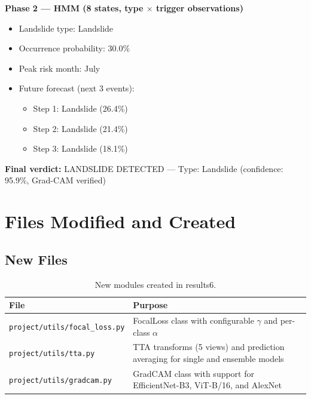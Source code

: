 \documentclass[11pt]{article}
\begin{document}
\vspace{0.3cm}
\noindent \textbf{Phase 2 --- HMM (8 states, type $\times$ trigger observations)}
\begin{itemize}[noitemsep]
    \item Landslide type: Landslide
    \item Occurrence probability: 30.0\%
    \item Peak risk month: July
    \item Future forecast (next 3 events):
    \begin{itemize}
        \item Step 1: Landslide (26.4\%)
        \item Step 2: Landslide (21.4\%)
        \item Step 3: Landslide (18.1\%)
    \end{itemize}
\end{itemize}

\noindent \textbf{Final verdict:} LANDSLIDE DETECTED --- Type: Landslide (confidence: 95.9\%, Grad-CAM verified)

\section{Files Modified and Created}

\subsection{New Files}

\begin{table}[H]
\centering
\renewcommand{\arraystretch}{1.2}
\begin{tabularx}{\textwidth}{lX}
\toprule
\textbf{File} & \textbf{Purpose} \\
\midrule
\texttt{project/utils/focal\_loss.py}  & FocalLoss class with configurable $\gamma$ and per-class $\alpha$ \\
\texttt{project/utils/tta.py}          & TTA transforms (5 views) and prediction averaging for single and ensemble models \\
\texttt{project/utils/gradcam.py}      & GradCAM class with support for EfficientNet-B3, ViT-B/16, and AlexNet \\
\bottomrule
\end{tabularx}
\caption{New modules created in results6.}
\end{table}
\end{document}

